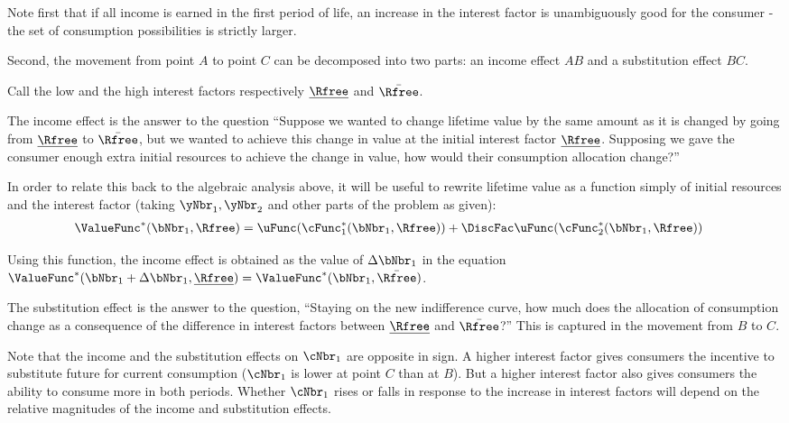   Note first that if all income is earned in the first period of life, an
  increase in the interest factor is unambiguously good for the consumer -
  the set of consumption possibilities is strictly larger.

  Second, the movement from point $A$ to point $C$ can be decomposed into two parts: an
  income effect $AB$ and a substitution effect $BC$.

  Call the low and the high interest factors respectively
  $\underline{\Rfree}$ and $\bar{\Rfree}$.

  The income effect is the answer to the question ``Suppose we wanted to change lifetime value by the same amount as it is changed by going from $\underline{\Rfree}$ to $\bar{\Rfree}$, but we wanted to achieve this change in value at the initial interest factor $\underline{\Rfree}$.  Supposing we gave the consumer enough extra initial resources to achieve the change in value, how would their consumption allocation change?''

  In order to relate this back to the algebraic analysis above, it will be useful to rewrite lifetime value as a function simply of initial resources and the interest factor (taking ${\yNbr_{1},\yNbr_{2}}$ and other parts of the problem as given):
  \begin{equation}\begin{gathered}\begin{aligned}
        \ValueFunc^{*}(\bNbr_{1},\Rfree) & =  \uFunc(\cFunc_{1}^{*}(\bNbr_{1},\Rfree))+\DiscFac \uFunc(\cFunc_{2}^{*}(\bNbr_{1},\Rfree))
      \end{aligned}\end{gathered}\end{equation}

  Using this function, the income effect is obtained as the value of
  $\Delta \bNbr_{1}$ in the equation $\ValueFunc^{*}(\bNbr_{1}+\Delta
  \bNbr_{1},\underline{\Rfree})=\ValueFunc^{*}(\bNbr_{1},\bar{\Rfree})$.

  The substitution effect is the answer to the question, ``Staying
  on the new indifference curve, how much does the allocation of
  consumption change as a consequence of the difference in
  interest factors between $\underline{\Rfree}$ and $\bar{\Rfree}$?''  This
  is captured in the movement from $B$ to $C$.

  Note that the income and the substitution effects on $\cNbr_{1}$ are
  opposite in sign.  A higher interest factor gives consumers the
  incentive to substitute future for current consumption ($\cNbr_{1}$ is
  lower at point $C$ than at $B$).  But a higher interest factor also
  gives consumers the ability to consume more in both periods.  Whether
  $\cNbr_{1}$ rises or falls in response to the increase in interest factors
  will depend on the relative magnitudes of the income and substitution
  effects.

